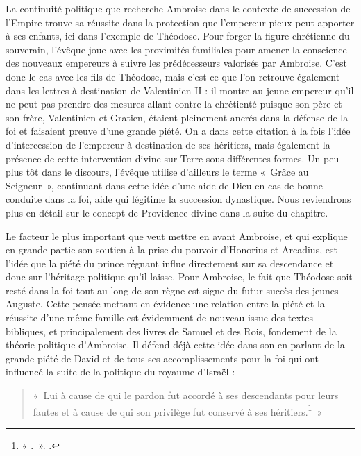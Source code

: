 La continuité politique que recherche Ambroise dans le contexte de succession de l'Empire trouve sa réussite dans la protection que l'empereur pieux peut apporter à ses enfants, ici dans l'exemple de Théodose. Pour forger la figure chrétienne du souverain, l'évêque joue avec les proximités familiales pour amener la conscience des nouveaux empereurs à suivre les prédécesseurs valorisés par Ambroise. C'est donc le cas avec les fils de Théodose, mais c'est ce que l'on retrouve également dans les lettres à destination de Valentinien II : il montre au jeune empereur qu'il ne peut pas prendre des mesures allant contre la chrétienté puisque son père et son frère, Valentinien et Gratien, étaient pleinement ancrés dans la défense de la foi et faisaient preuve d'une grande piété\autocite[, 16-17]{ambroise_lettres}. On a dans cette citation à la fois l’idée d'intercession de l’empereur à destination de ses héritiers, mais également la présence de cette intervention divine sur Terre sous différentes formes. Un peu plus tôt dans le discours, l’évêque utilise d’ailleurs le terme «~Grâce au Seigneur~», continuant dans cette idée d’une aide de Dieu en cas de bonne conduite dans la foi, aide qui légitime la succession dynastique. Nous reviendrons plus en détail sur le concept de Providence divine dans la suite du chapitre.

\bigskip

Le facteur le plus important que veut mettre en avant Ambroise, et qui explique en grande partie son soutien à la prise du pouvoir d’Honorius et Arcadius, est l’idée que la piété du prince régnant influe directement sur sa descendance et donc sur l’héritage politique qu’il laisse. Pour Ambroise, le fait que Théodose soit resté dans la foi tout au long de son règne est signe du futur succès des jeunes Auguste. Cette pensée mettant en évidence une relation entre la piété et la réussite d’une même famille est évidemment de nouveau issue des textes bibliques, et principalement des livres de Samuel et des Rois, fondement de la théorie politique d’Ambroise. Il défend déjà cette idée dans son  en parlant de la grande piété de David et de tous ses accomplissements pour la foi qui ont influencé la suite de la politique du royaume d'Israël :

\bigskip

\begin{quote}
«~Lui à cause de qui le pardon fut accordé à ses descendants pour leurs fautes et à cause de qui son privilège fut conservé à ses héritiers.\footnote{« .~». \cite[\nopp II, 35]{ambroise_devoirs_2}.}~»
\end{quote}

